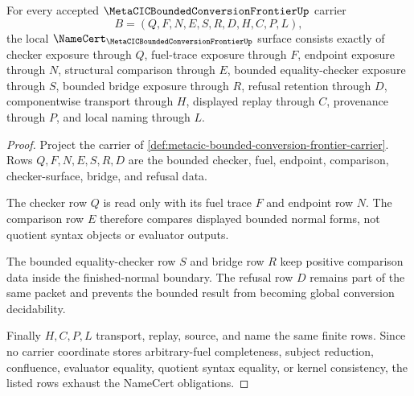\begin{theorem}
\label{thm:metacic-bounded-conversion-frontier-obligations}
For every accepted $\MetaCICBoundedConversionFrontierUp$ carrier
$$
B=(Q,F,N,E,S,R,D,H,C,P,L),
$$
the local $\NameCert_{\MetaCICBoundedConversionFrontierUp}$ surface consists exactly of checker exposure through $Q$, fuel-trace exposure through $F$, endpoint exposure through $N$, structural comparison through $E$, bounded equality-checker exposure through $S$, bounded bridge exposure through $R$, refusal retention through $D$, componentwise transport through $H$, displayed replay through $C$, provenance through $P$, and local naming through $L$.
\end{theorem}
\begin{proof}
Project the carrier of \autoref{def:metacic-bounded-conversion-frontier-carrier}. Rows $Q,F,N,E,S,R,D$ are the bounded checker, fuel, endpoint, comparison, checker-surface, bridge, and refusal data.

The checker row $Q$ is read only with its fuel trace $F$ and endpoint row $N$. The comparison row $E$ therefore compares displayed bounded normal forms, not quotient syntax objects or evaluator outputs.

The bounded equality-checker row $S$ and bridge row $R$ keep positive comparison data inside the finished-normal boundary. The refusal row $D$ remains part of the same packet and prevents the bounded result from becoming global conversion decidability.

Finally $H,C,P,L$ transport, replay, source, and name the same finite rows. Since no carrier coordinate stores arbitrary-fuel completeness, subject reduction, confluence, evaluator equality, quotient syntax equality, or kernel consistency, the listed rows exhaust the NameCert obligations.
\end{proof}

